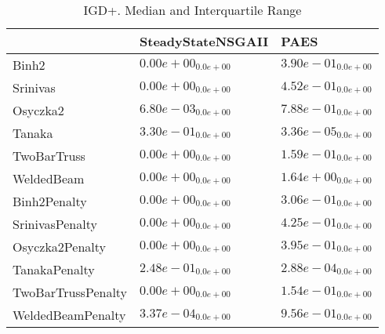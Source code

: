 \documentclass{article}
\begin{document}
\begin{table}
\caption{IGD+. Median and Interquartile Range}
\label{table: IGD+}
\centering
\begin{scriptsize}
\begin{tabular}{lll}
\hline & SteadyStateNSGAII &  PAES\\
\hline 
Binh2 & \cellcolor{gray95}$  0.00e+00_{ 0.0e+00}$ & \cellcolor{gray25}$  3.90e-01_{ 0.0e+00}$ \\
Srinivas & \cellcolor{gray95}$  0.00e+00_{ 0.0e+00}$ & \cellcolor{gray25}$  4.52e-01_{ 0.0e+00}$ \\
Osyczka2 & \cellcolor{gray95}$  6.80e-03_{ 0.0e+00}$ & \cellcolor{gray25}$  7.88e-01_{ 0.0e+00}$ \\
Tanaka & \cellcolor{gray25}$  3.30e-01_{ 0.0e+00}$ & \cellcolor{gray95}$  3.36e-05_{ 0.0e+00}$ \\
TwoBarTruss & \cellcolor{gray95}$  0.00e+00_{ 0.0e+00}$ & \cellcolor{gray25}$  1.59e-01_{ 0.0e+00}$ \\
WeldedBeam & \cellcolor{gray95}$  0.00e+00_{ 0.0e+00}$ & \cellcolor{gray25}$  1.64e+00_{ 0.0e+00}$ \\
Binh2Penalty & \cellcolor{gray95}$  0.00e+00_{ 0.0e+00}$ & \cellcolor{gray25}$  3.06e-01_{ 0.0e+00}$ \\
SrinivasPenalty & \cellcolor{gray95}$  0.00e+00_{ 0.0e+00}$ & \cellcolor{gray25}$  4.25e-01_{ 0.0e+00}$ \\
Osyczka2Penalty & \cellcolor{gray95}$  0.00e+00_{ 0.0e+00}$ & \cellcolor{gray25}$  3.95e-01_{ 0.0e+00}$ \\
TanakaPenalty & \cellcolor{gray25}$  2.48e-01_{ 0.0e+00}$ & \cellcolor{gray95}$  2.88e-04_{ 0.0e+00}$ \\
TwoBarTrussPenalty & \cellcolor{gray95}$  0.00e+00_{ 0.0e+00}$ & \cellcolor{gray25}$  1.54e-01_{ 0.0e+00}$ \\
WeldedBeamPenalty & \cellcolor{gray95}$  3.37e-04_{ 0.0e+00}$ & \cellcolor{gray25}$  9.56e-01_{ 0.0e+00}$ \\
\hline
\end{tabular}
\end{scriptsize}
\end{table}
\end{document}
